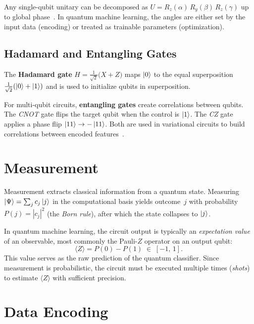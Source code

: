Any single-qubit unitary can be decomposed as $U = R_z(\alpha)\,R_y(\beta)\,R_z(\gamma)$ up to global phase~\cite{nielsen2010quantum}. In quantum machine learning, the angles are either set by the input data (encoding) or treated as trainable parameters (optimization).

\subsection{Hadamard and Entangling Gates}

The \textbf{Hadamard gate} $H = \frac{1}{\sqrt{2}}\big(X + Z\big)$ maps $\ket{0}$ to the equal superposition $\frac{1}{\sqrt{2}}(\ket{0}+\ket{1})$ and is used to initialize qubits in superposition.

For multi-qubit circuits, \textbf{entangling gates} create correlations between qubits. The \emph{CNOT} gate flips the target qubit when the control is $\ket{1}$. The \emph{CZ} gate applies a phase flip $\ket{11} \to -\ket{11}$. Both are used in variational circuits to build correlations between encoded features~\cite{cerezo2021variational}.
\section{Measurement}
\label{sec:measurement}

Measurement extracts classical information from a quantum state. Measuring $\ket{\Psi} = \sum_j c_j \ket{j}$ in the computational basis yields outcome~$j$ with probability $P(j) = |c_j|^2$ (the \emph{Born rule}), after which the state collapses to $\ket{j}$.

In quantum machine learning, the circuit output is typically an \emph{expectation value} of an observable, most commonly the Pauli-$Z$ operator on an output qubit:
\begin{equation}
    \langle Z \rangle = P(0) - P(1) \;\in\; [-1,\, 1].
    \label{eq:expectation}
\end{equation}
This value serves as the raw prediction of the quantum classifier. Since measurement is probabilistic, the circuit must be executed multiple times (\emph{shots}) to estimate $\langle Z \rangle$ with sufficient precision.

\section{Data Encoding}
\label{sec:encoding}

